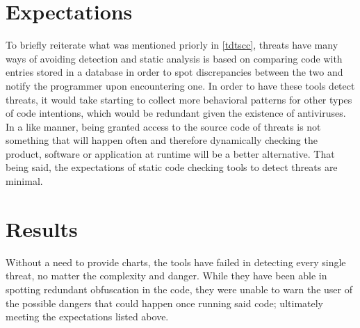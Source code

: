 \section{Expectations}

To briefly reiterate what was mentioned priorly in \ref{tdtscc}, threats have many ways of avoiding detection and static analysis is based on comparing code with entries stored in a database in order to spot discrepancies between the two and notify the programmer upon encountering one. In order to have these tools detect threats, it would take starting to collect more behavioral patterns for other types of code intentions, which would be redundant given the existence of antiviruses. \\

\noindent In a like manner, being granted access to the source code of threats is not something that will happen often and therefore dynamically checking the product, software or application at runtime will be a better alternative. That being said, the expectations of static code checking tools to detect threats are minimal.




\section{Results} \label{TDTSCResults}

Without a need to provide charts, the tools have failed in detecting every single threat, no matter the complexity and danger. While they have been able in spotting redundant obfuscation in the code, they were unable to warn the user of the possible dangers that could happen once running said code; ultimately meeting the expectations listed above.  